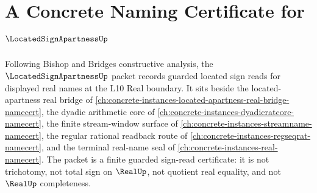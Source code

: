 \chapter{A Concrete Naming Certificate for $\LocatedSignApartnessUp$}
\label{ch:concrete-instances-located-sign-apartness-namecert}

Following Bishop and Bridges constructive analysis, the $\LocatedSignApartnessUp$ packet records guarded located sign reads for displayed real names at the L10 Real boundary. It sits beside the located-apartness real bridge of \autoref{ch:concrete-instances-located-apartness-real-bridge-namecert}, the dyadic arithmetic core of \autoref{ch:concrete-instances-dyadicratcore-namecert}, the finite stream-window surface of \autoref{ch:concrete-instances-streamname-namecert}, the regular rational readback route of \autoref{ch:concrete-instances-regseqrat-namecert}, and the terminal real-name seal of \autoref{ch:concrete-instances-real-namecert}. The packet is a finite guarded sign-read certificate: it is not trichotomy, not total sign on $\RealUp$, not quotient real equality, and not $\RealUp$ completeness.

